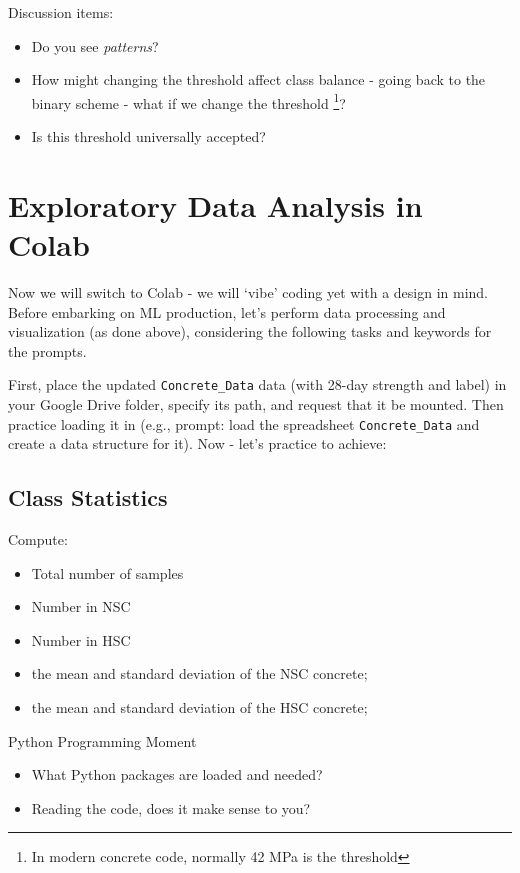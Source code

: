 \documentclass[12pt]{article}
\begin{document}
Discussion items:
\begin{itemize}
    \item Do you see \textit{patterns}?
    \item How might changing the threshold affect class balance - going back to the binary scheme - what if we change the threshold \footnote{In modern concrete code, normally 42 MPa is the threshold}? 
    \item Is this threshold universally accepted?
\end{itemize}

\section*{Exploratory Data Analysis in Colab}
Now we will switch to Colab - we will `vibe' coding yet with a design in mind. Before embarking on ML production, let's perform data processing and visualization (as done above), considering the following tasks and keywords for the prompts. 

First, place the updated \texttt{Concrete\_Data} data (with 28-day strength and label) in your Google Drive folder, specify its path, and request that it be mounted. Then practice loading it in (e.g., prompt: load the spreadsheet \texttt{Concrete\_Data} and create a data structure for it). Now - let's practice to achieve:

\subsection*{Class Statistics}

Compute:
\begin{itemize}
    \item Total number of samples
    \item Number in NSC
    \item Number in HSC
    \item the mean and standard deviation of the NSC concrete;
    \item the mean and standard deviation of the HSC concrete;
\end{itemize}

\begin{alert-box}{Python Programming Moment}
\begin{itemize}
    \item What Python packages are loaded and needed? 
    \item Reading the code, does it make sense to you?
\end{itemize}
\end{alert-box}
\end{document}
